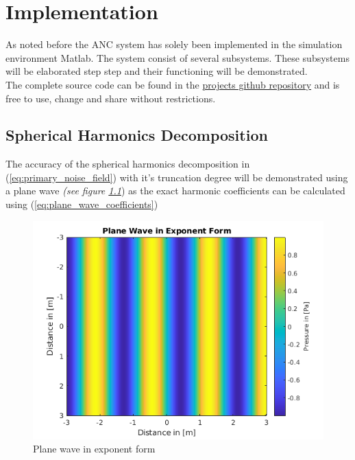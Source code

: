 \chapter{Implementation}

As noted before the ANC system has solely been implemented in the simulation environment Matlab. The system consist of several subsystems. These subsystems will be elaborated step step and their functioning will be demonstrated.\\
The complete source code can be found in the \color{blue}\href{https://github.com/leonardberresheim/MA---Active-Noise-Control-in-Spatial-Domains/tree/main/Matlab}{projects github repository} \color{black} and is free to use, change and share without restrictions.

\section{Spherical Harmonics Decomposition}
The accuracy of the spherical harmonics decomposition in (\ref{eq:primary_noise_field}) with it's truncation degree will be demonstrated using a plane wave \textit{(see figure \ref{fig:planeWaveExp}}) as the exact harmonic coefficients can be calculated using (\ref{eq:plane_wave_coefficients})
\begin{figure}
    \centerline{\includegraphics{LaTeX/images/plots/plane_Wave_exponent_form.png}}
    \caption{Plane wave in exponent form}
    \label{fig:planeWaveExp}
\end{figure}

